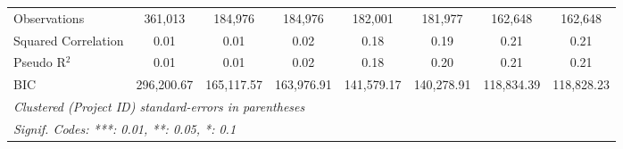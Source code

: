 \documentclass[
]{article}
\begin{document}
\begin{table}[htbp]
\begin{tabular}{lccccccc}
      Observations                        & 361,013        & 184,976        & 184,976       & 182,001       & 181,977       & 162,648       & 162,648\\  
      Squared Correlation                 & 0.01           & 0.01           & 0.02          & 0.18          & 0.19          & 0.21          & 0.21\\  
      Pseudo R$^2$                        & 0.01           & 0.01           & 0.02          & 0.18          & 0.20          & 0.21          & 0.21\\  
      BIC                                 & 296,200.67     & 165,117.57     & 163,976.91    & 141,579.17    & 140,278.91    & 118,834.39    & 118,828.23\\  
      \midrule
      \multicolumn{8}{l}{\emph{Clustered (Project ID) standard-errors in parentheses}}\\
      \multicolumn{8}{l}{\emph{Signif. Codes: ***: 0.01, **: 0.05, *: 0.1}}\\
   \end{tabular}
\end{table}
\begingroup
\centering
\small
\end{document}
